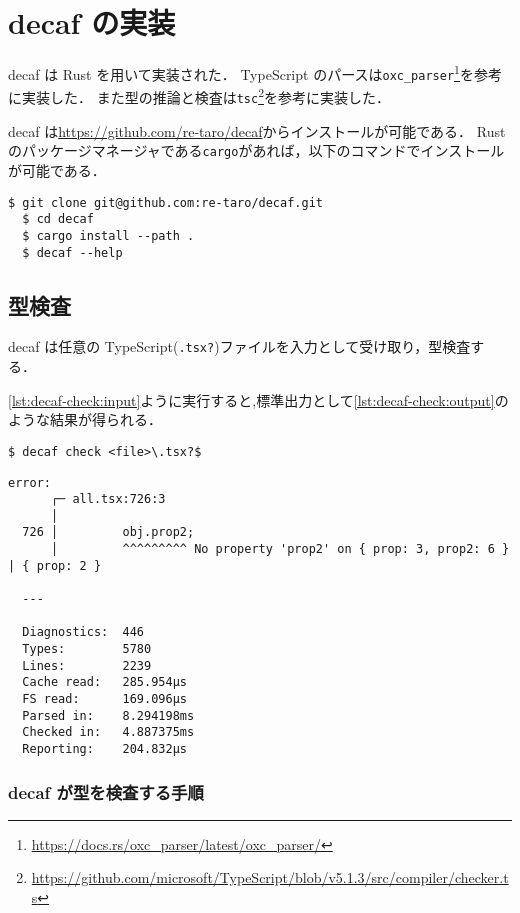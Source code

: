\chapter{decaf の実装}

decaf は Rust を用いて実装された．
TypeScript のパースは\texttt{oxc\_parser}\footnote{\url{https://docs.rs/oxc_parser/latest/oxc_parser/}}を参考に実装した．
また型の推論と検査は\texttt{tsc}\footnote{\url{https://github.com/microsoft/TypeScript/blob/v5.1.3/src/compiler/checker.ts}}を参考に実装した．

decaf は\url{https://github.com/re-taro/decaf}からインストールが可能である．
Rust のパッケージマネージャである\texttt{cargo}があれば，以下のコマンドでインストールが可能である．

\begin{lstlisting}[caption=decaf のインストール]
  $ git clone git@github.com:re-taro/decaf.git
  $ cd decaf
  $ cargo install --path .
  $ decaf --help
\end{lstlisting}

\section{型検査}

decaf は任意の TypeScript(\texttt{.tsx?})ファイルを入力として受け取り，型検査する．

\ref{lst:decaf-check:input}ように実行すると,標準出力として\ref{lst:decaf-check:output}のような結果が得られる．

\begin{lstlisting}[caption=decaf の型検査, label=lst:decaf-check:input]
  $ decaf check <file>\.tsx?$
\end{lstlisting}

\begin{lstlisting}[caption=decaf の型検査結果, label=lst:decaf-check:output]
  error:
      ┌─ all.tsx:726:3
      │
  726 │         obj.prop2;
      │         ^^^^^^^^^ No property 'prop2' on { prop: 3, prop2: 6 } | { prop: 2 }

  ---

  Diagnostics:	446
  Types:      	5780
  Lines:      	2239
  Cache read: 	285.954µs
  FS read:    	169.096µs
  Parsed in:  	8.294198ms
  Checked in: 	4.887375ms
  Reporting:  	204.832µs
\end{lstlisting}

\subsection{decaf が型を検査する手順}
\label{sec:decaf-check}

